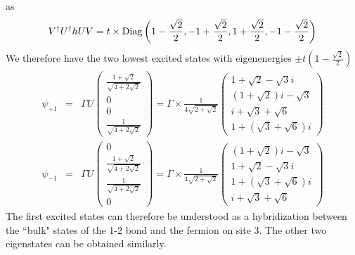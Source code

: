 \documentclass[aps,prb,showpacs,amsmath,amssymb,superscriptaddress]{revtex4-2}
\begin{document}
as
\begin{eqnarray}
	V^\dag U^\dag h U V =t\times {\rm Diag}\left( 1 -\frac{\sqrt{2}}{2},  -1 +\frac{\sqrt{2}}{2},  1 +\frac{\sqrt{2}}{2},  -1 -\frac{\sqrt{2}}{2} \right)
\end{eqnarray}
We therefore have the two lowest excited states with eigenenergies $\pm t(1-\frac{\sqrt{2}}{2})$
\begin{eqnarray}
	\psi_{+1} &=& \Gamma U \begin{pmatrix}
	\frac{1+ \sqrt{2}}{\sqrt{4+2\sqrt{2}}} \\
0  \\
0 \\
\frac{1}{\sqrt{4+2\sqrt{2}}} 
	\end{pmatrix} = \Gamma \times \frac{1}{4\sqrt{2+\sqrt{2}}} \begin{pmatrix}
	1+\sqrt{2}-\sqrt{3} i \\
	(1+\sqrt{2})i-\sqrt{3}  \\
	i+ \sqrt{3} + \sqrt{6} \\
	1 + (\sqrt{3} + \sqrt{6})i
\end{pmatrix} \\\nonumber
	\psi_{-1} &=& \Gamma  U \begin{pmatrix}
		0\\
	\frac{1+ \sqrt{2}}{\sqrt{4+2\sqrt{2}}} \\
	\frac{1}{\sqrt{4+2\sqrt{2}}} \\
	0
\end{pmatrix} = \Gamma \times \frac{1}{4\sqrt{2+\sqrt{2}}} \begin{pmatrix}
	(1+\sqrt{2})i-\sqrt{3} \\
	1+\sqrt{2}-\sqrt{3} i \\
	1+ (\sqrt{3} + \sqrt{6} )i\\
    i + \sqrt{3} + \sqrt{6}
\end{pmatrix}
\end{eqnarray}
The first excited states can therefore be understood as a hybridization between the ``bulk" states of the 1-2 bond and the fermion on site 3. The other two eigenstates can be obtained similarly.
\end{document}

